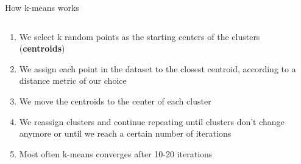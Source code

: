 \documentclass[9pt, aspectratio=169]{beamer}
\begin{document}
\begin{frame}
    {How k-means works}
    \begin{columns}
        \begin{column}{.5\textwidth}
            \begin{enumerate}[<+->]
                \item We select k random points as the starting centers of the clusters (\textbf{centroids})
                \item We assign each point in the dataset to the closest centroid, according to a distance metric of our choice
                \item We move the centroids to the center of each cluster
                \item We reassign clusters and continue repeating until clusters don’t change anymore or until we reach a certain number of iterations
                \item Most often k-means converges after 10-20 iterations
            \end{enumerate}
        \end{column}
        \begin{column}{.5\textwidth}
            \centering

\end{column}
\end{columns}
\end{frame}
\end{document}
